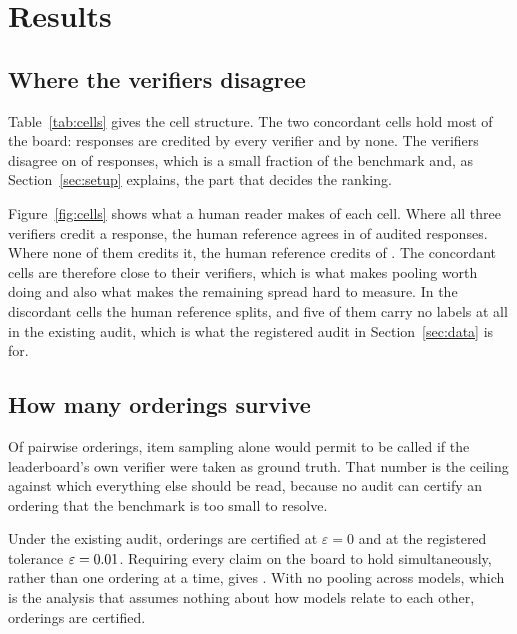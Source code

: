 
\section{Results}
\label{sec:results}

\subsection{Where the verifiers disagree}

Table~\ref{tab:cells} gives the cell structure. The two concordant cells hold most of the
board: \CellAgreeAll{} responses are credited by every verifier and \CellRejectAll{} by none.
The verifiers disagree on \RowsAnyDisagree{} of \NumRows{} responses, which is a small
fraction of the benchmark and, as Section~\ref{sec:setup} explains, the part that decides the
ranking.

Figure~\ref{fig:cells} shows what a human reader makes of each cell. Where all three verifiers
credit a response, the human reference agrees in \AuditCorrectAgreeAll{} of
\AuditNAgreeAll{} audited responses. Where none of them credits it, the human reference
credits \AuditCorrectRejectAll{} of \AuditNRejectAll{}. The concordant cells are therefore
close to their verifiers, which is what makes pooling worth doing and also what makes the
remaining spread hard to measure. In the discordant cells the human reference splits, and
five of them carry no labels at all in the existing audit, which is what the registered audit
in Section~\ref{sec:data} is for.

\subsection{How many orderings survive}

Of \NumOrderings{} pairwise orderings, item sampling alone would permit \CeilingEm{} to be
called if the leaderboard's own verifier were taken as ground truth. That number is the
ceiling against which everything else should be read, because no audit can certify an ordering
that the benchmark is too small to resolve.

Under the existing audit, \CertEpsZero{} orderings are certified at $\varepsilon = 0$ and
\CertPrereg{} at the registered tolerance $\varepsilon = 0.01$. Requiring every claim on
the board to hold simultaneously, rather than one ordering at a time, gives \CertPreregSim{}.
With no pooling across models, which is the analysis that assumes nothing about how models
relate to each other, \CertNoPooling{} orderings are certified.

